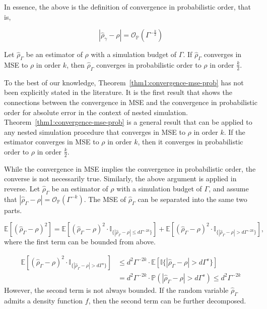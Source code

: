 In essence, the above is the definition of convergence in probabilistic order, that is,

$$
    \left| \hat{\rho}_{\gamma} - \rho \right| = \mathcal{O}_\mathbb{P} \left( \Gamma^{-\frac{k}{2}} \right)
$$

\begin{theorem} \label{thm1:convergence-mse-prob}
    Let $\hat{\rho}_{\Gamma}$ be an estimator of $\rho$ with a simulation budget of $\Gamma$. 
    If $\hat{\rho}_{\Gamma}$ converges in MSE to $\rho$ in order $k$, then $\hat{\rho}_{\Gamma}$ converges in probabilistic order to $\rho$ in order $\frac{k}{2}$.
\end{theorem}

To the best of our knowledge, Theorem~\ref{thm1:convergence-mse-prob} has not been explicitly stated in the literature.
It is the first result that shows the connections between the convergence in MSE and the convergence in probabilistic order for absolute error in the context of nested simulation.
Theorem~\ref{thm1:convergence-mse-prob} is a general result that can be applied to any nested simulation procedure that converges in MSE to $\rho$ in order $k$.
If the estimator converges in MSE to $\rho$ in order $k$, then it converges in probabilistic order to $\rho$ in order $\frac{k}{2}$.

While the convergence in MSE implies the convergence in probabilistic order, the converse is not necessarily true.
Similarly, the above argument is applied in reverse.
Let $\hat{\rho}_{\Gamma}$ be an estimator of $\rho$ with a simulation budget of $\Gamma$, and assume that $|\hat{\rho}_{\Gamma} - \rho| = \mathcal{O}_{\mathbb{P}}(\Gamma^{-k})$.
The MSE of $\hat{\rho}_{\Gamma}$ can be separated into the same two parts.

$$
    \mathbb{E}\left[ \left(\hat{\rho}_{\Gamma} - \rho\right)^2 \right] = \mathbb{E} \left[ \left(\hat{\rho}_{\Gamma} - \rho\right)^2 \cdot \mathbb{I}_{\{|\hat{\rho}_{\Gamma} - \rho| \leq d\Gamma^{-2k}\}} \right] + \mathbb{E} \left[ \left(\hat{\rho}_{\Gamma} - \rho\right)^2 \cdot \mathbb{I}_{\{|\hat{\rho}_{\Gamma} - \rho| > d\Gamma^{-2k}\}} \right], 
$$
where the first term can be bounded from above.

\begin{align*}
    \mathbb{E} \left[ \left(\hat{\rho}_{\Gamma} - \rho\right)^2 \cdot \mathbb{I}_{\{|\hat{\rho}_{\Gamma} - \rho| > d\Gamma^s\}} \right] 
    & \leq d^2 \Gamma^{-2k} \cdot \mathbb{E} \left[ \mathbb{I}\{|\hat{\rho}_{\Gamma} - \rho| > d\Gamma^s \} \right] \\
    & = d^2 \Gamma^{-2k} \cdot \mathbb{P} \left(|\hat{\rho}_{\Gamma} - \rho| > d\Gamma^s \right) \leq d^2 \Gamma^{-2k} 
\end{align*}
However, the second term is not always bounded. 
If the random variable $\hat{\rho}_{\Gamma}$ admits a density function $f$, then the second term can be further decomposed.

